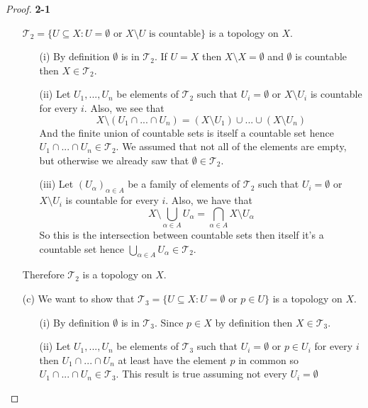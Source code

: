 \documentclass[11pt]{article}
\newcommand{\Topo}{\mathcal{T}}
\theoremstyle{definition}
\begin{document}
\begin{proof}{\textbf{2-1}}
\begin{itemize}
        $\Topo_2 = \{U \subseteq X: U = \emptyset \text{ or }X \setminus U \text{ is countable}\}$
        is a topology on $X$.
            \begin{itemize}
                \item [(i)] By definition $\emptyset$ is in $\Topo_2$. If $U = X$
                then $X \setminus X = \emptyset$ and $\emptyset$ is countable then
                $X \in \Topo_2$.
                \item [(ii)] Let $U_1, ..., U_n$ be elements of $\Topo_2$ such that
                $U_i = \emptyset$ or $X \setminus U_i$ is countable for every
                $i$. Also, we see that 
                $$X \setminus (U_1 \cap ... \cap U_n)
                = (X \setminus U_1) \cup ... \cup (X \setminus U_n)$$
                And the finite union of countable sets is 
                itself a countable set hence $U_1 \cap ... \cap U_n \in \Topo_2$.
                We assumed that not all of the elements are empty,  but otherwise
                we already saw that $\emptyset \in \Topo_2$.
                \item [(iii)] Let $(U_\alpha)_{\alpha \in A}$ be a family of
                elements of $\Topo_2$  such that
                $U_i = \emptyset$ or $X \setminus U_i$ is countable for every
                $i$. Also, we have that
                $$X \setminus \bigcup_{\alpha \in A} U_\alpha
                = \bigcap_{\alpha \in A} X \setminus U_\alpha$$
                So this is the intersection between countable sets then itself
                it's a countable set hence
                $\bigcup_{\alpha \in A} U_\alpha \in \Topo_2$.
            \end{itemize} 
            Therefore $\Topo_2$ is a topology on $X$.    
        \item [(c)] We want to show that
        $\Topo_3 = \{U \subseteq X: U = \emptyset \text{ or }p \in U\}$
        is a topology on $X$.
            \begin{itemize}
                \item [(i)] By definition $\emptyset$ is in $\Topo_3$.
                Since $p \in X$ by definition then $X \in \Topo_3$.
                \item [(ii)] Let $U_1, ..., U_n$ be elements of $\Topo_3$ such that
                $U_i = \emptyset$ or $p \in U_i$ for every $i$ then 
                $U_1 \cap ... \cap U_n$ at least have the element $p$ in
                common so $U_1 \cap ... \cap U_n \in \Topo_3$.
                This result is true assuming not every $U_i = \emptyset$

\end{itemize}
\end{itemize}
\end{proof}
\end{document}
